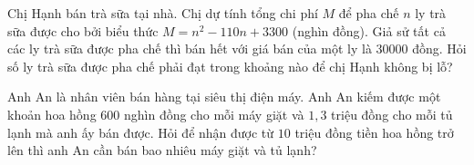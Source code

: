 \begin{bt}%
	Chị Hạnh bán trà sữa tại nhà. Chị dự tính tổng chi phí $M$ để pha chế $n$ ly trà sữa được cho bởi biểu thức $M=n^2-110 n+3300$ (nghìn đồng). Giả sử tất cả các ly trà sữa được pha chế thì bán hết với giá bán của một ly là $30000$ đồng. Hỏi số ly trà sữa được pha chế phải đạt trong khoảng nào để chị Hạnh không bị lỗ?
\end{bt}

\begin{bt}%
		Anh An là nhân viên bán hàng tại siêu thị điện máy. Anh An kiếm được một khoản hoa hồng $600$ nghìn đồng cho mỗi máy giặt và $1{,}3$ triệu đồng cho mỗi tủ lạnh mà anh ấy bán được. Hỏi để nhận được từ $10$ triệu đồng tiền hoa hồng trở lên thì anh An cần bán bao nhiêu máy giặt và tủ lạnh?
	\end{bt}

